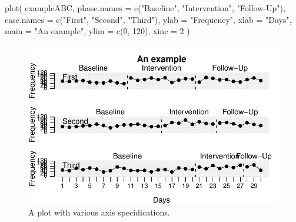 \documentclass[
  letterpaper,
  DIV=11,
  numbers=noendperiod]{scrreprt}
\newenvironment{Shaded}{\begin{snugshade}}{\end{snugshade}}
\newcommand{\AttributeTok}[1]{\textcolor[rgb]{0.40,0.45,0.13}{#1}}
\newcommand{\DecValTok}[1]{\textcolor[rgb]{0.68,0.00,0.00}{#1}}
\newcommand{\FunctionTok}[1]{\textcolor[rgb]{0.28,0.35,0.67}{#1}}
\newcommand{\NormalTok}[1]{\textcolor[rgb]{0.00,0.23,0.31}{#1}}
\newcommand{\StringTok}[1]{\textcolor[rgb]{0.13,0.47,0.30}{#1}}
\begin{document}
\begin{Shaded}
\begin{Highlighting}[]
\FunctionTok{plot}\NormalTok{(}
\NormalTok{  exampleABC,}
  \AttributeTok{phase.names =} \FunctionTok{c}\NormalTok{(}\StringTok{"Baseline"}\NormalTok{, }\StringTok{"Intervention"}\NormalTok{, }\StringTok{"Follow{-}Up"}\NormalTok{),}
  \AttributeTok{case.names =} \FunctionTok{c}\NormalTok{(}\StringTok{"First"}\NormalTok{, }\StringTok{"Second"}\NormalTok{, }\StringTok{"Third"}\NormalTok{),}
  \AttributeTok{ylab =} \StringTok{"Frequency"}\NormalTok{,}
  \AttributeTok{xlab =} \StringTok{"Days"}\NormalTok{,}
  \AttributeTok{main =} \StringTok{"An example"}\NormalTok{,}
  \AttributeTok{ylim =} \FunctionTok{c}\NormalTok{(}\DecValTok{0}\NormalTok{, }\DecValTok{120}\NormalTok{),}
  \AttributeTok{xinc =} \DecValTok{2}
\NormalTok{)}
\end{Highlighting}
\end{Shaded}

\begin{figure}[H]

{\centering \includegraphics{./app_supseded_functions_files/figure-pdf/ex-plot-axis-1.pdf}

}

\caption{A plot with various axis specidications.}

\end{figure}
\end{document}
